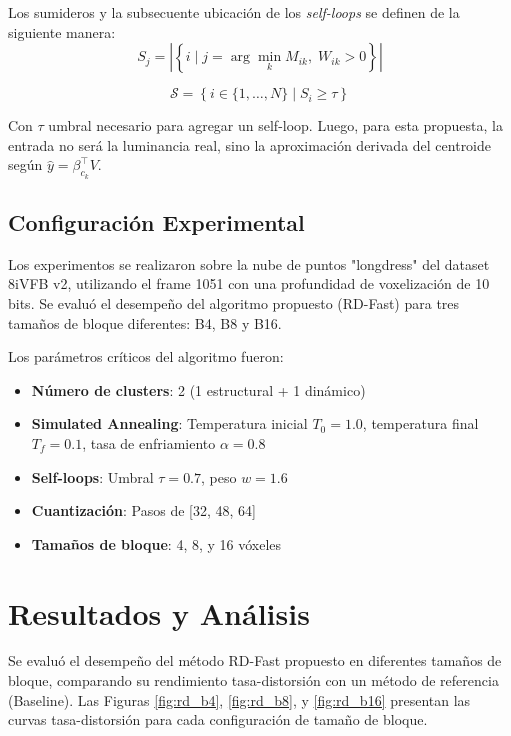 Los sumideros y la subsecuente ubicación de los \textit{self-loops} se definen de la siguiente manera:
\begin{equation}
    S_j = \left| \left\{ i \mid j = \arg\min_{k} M_{ik}, \; W_{ik} > 0 \right\} \right|
\end{equation}

\begin{equation}
    \mathcal{S} = \left\{ i \in \{1,\dots,N\} \mid S_i \geq \tau \right\}
\end{equation}

Con $\tau$ umbral necesario para agregar un self-loop. Luego, para esta propuesta, la entrada no será la luminancia real, sino la aproximación derivada del centroide según \(\hat{y} = \beta_{c_k}^\top V\). 

\subsection{Configuración Experimental}
Los experimentos se realizaron sobre la nube de puntos "longdress" del dataset 8iVFB v2, utilizando el frame 1051 con una profundidad de voxelización de 10 bits\cite{deon2017voxelized}. Se evaluó el desempeño del algoritmo propuesto (RD-Fast) para tres tamaños de bloque diferentes: B4, B8 y B16.

Los parámetros críticos del algoritmo fueron:
\begin{itemize}
    \item \textbf{Número de clusters}: 2 (1 estructural + 1 dinámico)
    \item \textbf{Simulated Annealing}: Temperatura inicial $T_0 = 1.0$, temperatura final $T_f = 0.1$, tasa de enfriamiento $\alpha = 0.8$
    \item \textbf{Self-loops}: Umbral $\tau = 0.7$, peso $w = 1.6$
    \item \textbf{Cuantización}: Pasos de [32, 48, 64]
    \item \textbf{Tamaños de bloque}: 4, 8, y 16 vóxeles
\end{itemize}

\section{Resultados y Análisis}
Se evaluó el desempeño del método RD-Fast propuesto en diferentes tamaños de bloque, comparando su rendimiento tasa-distorsión con un método de referencia (Baseline). Las Figuras \ref{fig:rd_b4}, \ref{fig:rd_b8}, y \ref{fig:rd_b16} presentan las curvas tasa-distorsión para cada configuración de tamaño de bloque.

